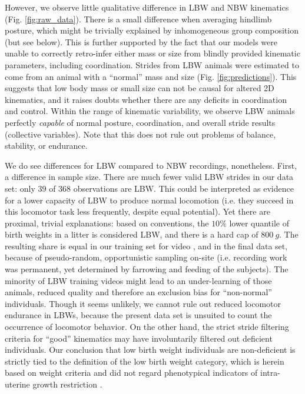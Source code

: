 However, we observe little qualitative difference in LBW and NBW kinematics (Fig. \ref{fig:raw_data}).
There is a small difference when averaging hindlimb posture, which might be trivially explained by inhomogeneous group composition (but see below).
This is further supported by the fact that our models were unable to correctly retro-infer either mass or size from blindly provided kinematic parameters, including coordination.
Strides from LBW animals were estimated to come from an animal with a ``normal'' mass and size (Fig. \ref{fig:predictions}).
This suggests that low body mass or small size can not be causal for altered 2D kinematics, and it raises doubts whether there are any deficits in coordination and control.
Within the range of kinematic variability, we observe LBW animals perfectly \emph{capable} of normal posture, coordination, and overall stride results (collective variables).
Note that this does not rule out problems of balance, stability, or endurance.


We do see differences for LBW compared to NBW recordings, nonetheless.
First, a difference in sample size.
There are much fewer valid LBW strides in our data set: only \(39\) of \(368\) observations are LBW.
This could be interpreted as evidence for a lower capacity  of LBW to produce normal locomotion (i.e. they succeed in this locomotor task less frequently, despite equal potential).
Yet there are proximal, trivial explanations: based on conventions, the \(10 \%\) lower quantile of birth weights in a litter is considered LBW, and there is a hard cap of \(800\ g\).
The resulting share is equal in our training set for video , and in the final data set, because of pseudo-random, opportunistic sampling on-site (i.e. recording work was permanent, yet determined by farrowing and feeding of the subjects).
The minority of LBW training videos might lead to an under-learning of those animals, reduced  quality and therefore an exclusion bias for ``non-normal'' individuals.
Though it seems unlikely, we cannot rule out reduced locomotor endurance in LBWs, because the present data set is unsuited to count the occurrence of locomotor behavior.
On the other hand, the strict stride filtering criteria for ``good'' kinematics may have involuntarily filtered out deficient individuals.
Our conclusion that low birth weight individuals are non-deficient is strictly tied to the definition of the low birth weight category, which is herein based on weight criteria and did not regard phenotypical indicators of intra-uterine growth restriction \citep[which we did not record, \textit{cf.}][]{Amdi2013}.


